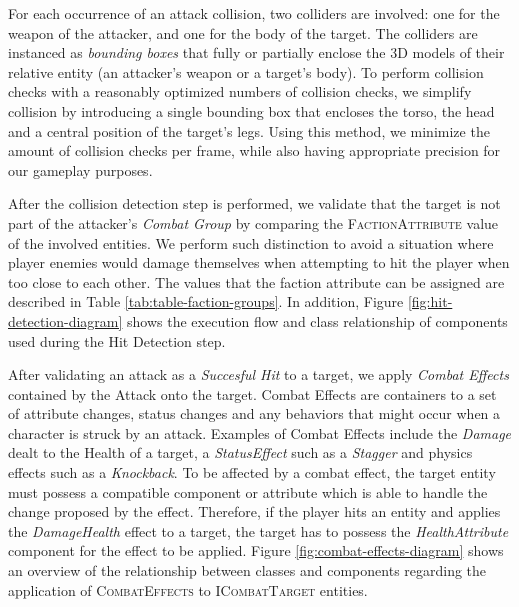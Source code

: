 For each occurrence of an attack collision, two colliders are involved: one for the weapon of the attacker, and one for the body of the target. The colliders are instanced as \emph{bounding boxes} that fully or partially enclose the 3D models of their relative entity (an attacker's weapon or a target's body). To perform collision checks with a reasonably optimized numbers of collision checks, we simplify collision by introducing a single bounding box that encloses the torso, the head and a central position of the target's legs. Using this method, we minimize the amount of collision checks per frame, while also having appropriate precision for our gameplay purposes.

After the collision detection step is performed, we validate that the target is not part of the attacker's \emph{Combat Group} by comparing the \textsc{FactionAttribute} value of the involved entities. We perform such distinction to avoid a situation where player enemies would damage themselves when attempting to hit the player when too close to each other. The values that the faction attribute can be assigned are described in Table \ref{tab:table-faction-groups}. In addition, Figure \ref{fig:hit-detection-diagram} shows the execution flow and class relationship of components used during the Hit Detection step.





After validating an attack as a \emph{Succesful Hit} to a target, we apply \emph{Combat Effects} contained by the Attack onto the target. Combat Effects are containers to a set of attribute changes, status changes and any behaviors that might occur when a character is struck by an attack. Examples of Combat Effects include the \emph{Damage} dealt to the Health of a target, a \emph{StatusEffect} such as a \emph{Stagger} and physics effects such as a \emph{Knockback}. To be affected by a combat effect, the target entity must possess a compatible component or attribute which is able to handle the change proposed by the effect. Therefore, if the player hits an entity and applies the \emph{DamageHealth} effect to a target, the target has to possess the \emph{HealthAttribute} component for the effect to be applied. Figure \ref{fig:combat-effects-diagram} shows an overview of the relationship between classes and components regarding the application of \textsc{CombatEffects} to \textsc{ICombatTarget} entities.

